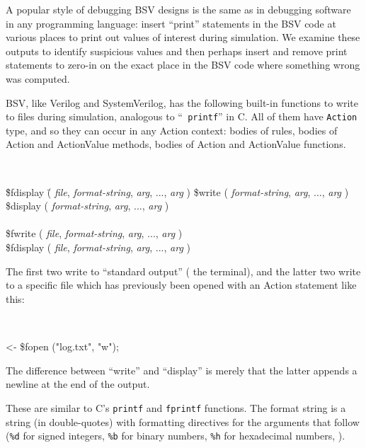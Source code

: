 \label{Sec_display_and_fmt}


A popular style of debugging BSV designs is the same as in debugging
software in any programming language: insert ``print'' statements in
the BSV code at various places to print out values of interest during
simulation.  We examine these outputs to identify suspicious values
and then perhaps insert and remove print statements to zero-in on the
exact place in the BSV code where something wrong was computed.

BSV, like Verilog and SystemVerilog, has the following built-in
functions to write to files during simulation, analogous to ``{\tt
printf}'' in C. All of them have {\tt Action} type, and so they can
occur in any Action context: bodies of rules, bodies of Action and
ActionValue methods, bodies of Action and ActionValue functions.

{\tt
\begin{tabbing}
\hmmm\= \$fdisplay \= ( {\it file}, \= {\it format-string}, {\it arg}, ..., {\it arg} ) \kill
     \> \$write    \> (             \> {\it format-string}, {\it arg}, ..., {\it arg} ) \\
     \> \$display  \> (             \> {\it format-string}, {\it arg}, ..., {\it arg} ) \\
\\
     \> \$fwrite   \> ( {\it file}, \> {\it format-string}, {\it arg}, ..., {\it arg} ) \\
     \> \$fdisplay \> ( {\it file}, \= {\it format-string}, {\it arg}, ..., {\it arg} )
\end{tabbing}
}

The first two write to ``standard output'' ({\ie} the terminal), and
the latter two write to a specific file which has previously been
opened with an Action statement like this:

{\tt
\begin{tabbing}
 <- \$fopen ("log.txt", "w");
\end{tabbing}
}

The difference between ``write'' and ``display'' is merely that the
latter appends a newline at the end of the output.

These are similar to C's \verb|printf| and \verb|fprintf| functions.
The format string is a string (in double-quotes) with formatting
directives for the arguments that follow (\verb|%d| for signed
integers, \verb|%b| for binary numbers, \verb|%h| for hexadecimal
numbers, {\etc}).

